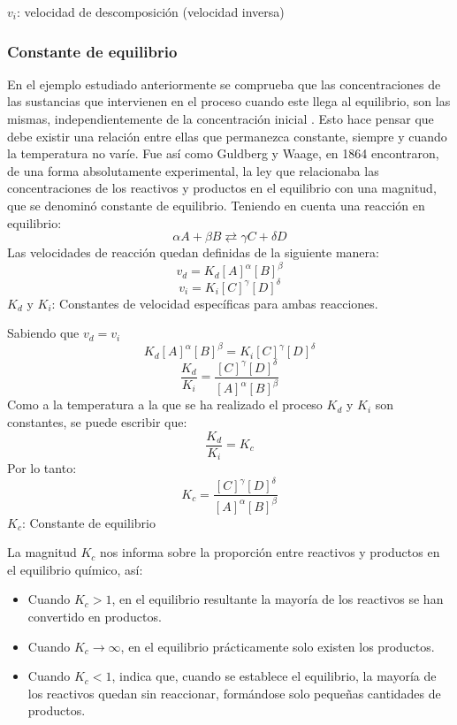 \documentclass[11pt]{article}
\begin{document}
    $v_i$: velocidad de descomposición (velocidad inversa)
    \subsubsection{Constante de equilibrio}
    En el ejemplo estudiado anteriormente se comprueba que las concentraciones de las sustancias que intervienen en el proceso cuando este llega al equilibrio, son las mismas, independientemente de la concentración inicial \cite{santana}. Esto hace pensar que debe existir una relación entre ellas que permanezca constante, siempre y cuando la temperatura no varíe. Fue así como Guldberg y Waage, en 1864 encontraron, de una forma absolutamente experimental, la ley que relacionaba las concentraciones de los reactivos y productos en el equilibrio con una magnitud, que se denominó constante de equilibrio.
    Teniendo en cuenta una reacción en equilibrio:
    \begin{equation*}
        \alpha A + \beta B \rightleftarrows  \gamma C + \delta D
    \end{equation*}
    Las velocidades de reacción quedan definidas de la siguiente manera:
    \begin{equation*}
        v_d = K_d[A]^\alpha[B]^\beta
    \end{equation*}
    \begin{equation*}
        v_i = K_i[C]^\gamma[D]^\delta
    \end{equation*}
    $K_d$ y $K_i$: Constantes de velocidad específicas para ambas reacciones.

    Sabiendo que $v_d = v_i$
    \begin{equation*}
        K_d[A]^\alpha[B]^\beta = K_i[C]^\gamma[D]^\delta
    \end{equation*}
    \begin{equation*}
        \frac{K_d}{K_i}  = \frac{[C]^\gamma[D]^\delta}{[A]^\alpha[B]^\beta} 
    \end{equation*}
    Como a la temperatura a la que se ha realizado el proceso $K_d$ y $K_i$ son constantes, se puede escribir que:
    \begin{equation*}
        \frac{K_d}{K_i}  = K_c 
    \end{equation*}
    Por lo tanto:
    \begin{equation*}
        K_c  = \frac{[C]^\gamma[D]^\delta}{[A]^\alpha[B]^\beta} 
    \end{equation*}
    $K_c$: Constante de equilibrio

    La magnitud $K_c$ nos informa sobre la proporción entre reactivos y productos en el equilibrio químico, así:
    \begin{itemize}
        \item Cuando $ K_c > 1$, en el equilibrio resultante la mayoría de los reactivos se han convertido en productos.
        \item Cuando $K_c \rightarrow \infty $, en el equilibrio prácticamente solo existen los productos.
        \item Cuando $K_c < 1$, indica que, cuando se establece el equilibrio, la mayoría de los reactivos quedan sin reaccionar, formándose solo pequeñas cantidades de productos.
    \end{itemize}
\end{document}
